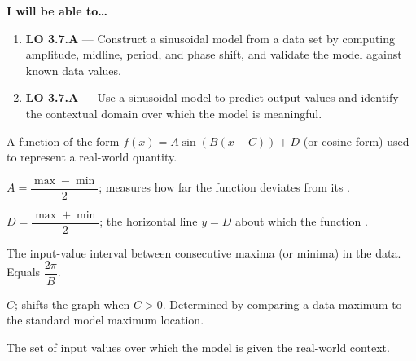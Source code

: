 \documentclass[10pt]{article}
\begin{document}
\namedateperiod

\vspace{0.10in}

\begin{objectivebox}
\textbf{I will be able to\ldots}
\begin{enumerate}[leftmargin=1.5em, itemsep=4pt]
  \item \textbf{LO 3.7.A} --- Construct a sinusoidal model from a data set by
    computing amplitude, midline, period, and phase shift, and validate the
    model against known data values. \writeline
  \item \textbf{LO 3.7.A} --- Use a sinusoidal model to predict output values
    and identify the contextual domain over which the model is meaningful.
    \writeline
\end{enumerate}
\end{objectivebox}

\vspace{0.08in}

\begin{vocabbox}
\begin{description}[leftmargin=0pt, itemsep=6pt]
  \item[\termblanklong{sinusoidal model}]
    A function of the form $f(x) = A\sin(B(x - C)) + D$ (or cosine form) used
    to represent a \underline{\hspace{3cm}} real-world quantity.

  \item[\termblanklong{amplitude}]
    $A = \dfrac{\max - \min}{2}$; measures how far the function deviates from
    its \underline{\hspace{2cm}}.

  \item[\termblanklong{vertical shift / midline}]
    $D = \dfrac{\max + \min}{2}$; the horizontal line $y = D$ about which the
    function \underline{\hspace{3cm}}.

  \item[\termblanklong{period}]
    The \underline{\hspace{3cm}} input-value interval between consecutive maxima
    (or minima) in the data. Equals $\dfrac{2\pi}{B}$.

  \item[\termblanklong{phase shift}]
    $C$; shifts the graph \underline{\hspace{1.5cm}} when $C > 0$. Determined
    by comparing a data maximum to the standard model maximum location.

  \item[\termblanklong{contextual domain}]
    The set of input values over which the model is \underline{\hspace{3cm}}
    given the real-world context.
\end{description}
\end{vocabbox}
\end{document}
